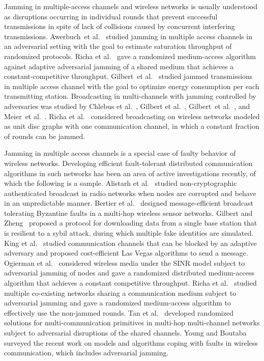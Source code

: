 \documentclass[11pt]{article}
\begin{document}
Jamming in multiple-access channels and wireless networks is usually understood as disruptions occurring in individual rounds that prevent successful transmissions in spite of lack of collisions caused by concurrent interfering transmissions.
Awerbuch~et al.~\cite{AwerbuchRSSZ14} studied jamming in multiple access channels in an adversarial setting with the goal to estimate saturation throughput of randomized protocols.
Richa et al.~\cite{RichaSSZ-TN13} gave a randomized medium-access algorithm against adaptive adversarial jamming of a shared medium that achieves a constant-competitive throughput. 
Gilbert~et al.~\cite{GilbertKPPSY14} studied jammed transmissions in multiple access channel with the goal to optimize energy consumption per each transmitting station.
Broadcasting in multi-channels with  jamming controlled by adversaries was studied by Chlebus et al.~\cite{ChlebusDK16}, Gilbert et al.~\cite{GilbertGKN-INFOCOM09}, Gilbert~et al.~\cite{GilbertGN09},  and Meier~et al.~\cite{MeierPSW09}.
Richa et al.~\cite{RichaSSZ-DC13} considered broadcasting on wireless networks modeled as unit disc graphs with one communication channel, in which a constant fraction of rounds can be jammed.

Jamming in multiple access channels is a special case of faulty behavior of wireless  networks.
Developing efficient fault-tolerant distributed communication algorithms in such networks has been an area of active investigations recently, of which the following is a sample.
 Alistarh et al.~\cite{AlistarhGGMN-SPAA10} studied non-cryptographic authenticated broadcast in radio networks when nodes are corrupted and behave in an unpredictable manner.
Bertier et al.~\cite{BertierKT-ICDCS10} designed message-efficient broadcast tolerating
Byzantine faults in a multi-hop wireless sensor networks.
Gilbert and Zheng~\cite{GilbertZ-TOPC15} proposed a protocol for downloading data from a single base station that is resilient to a sybil attack, during which multiple fake identities are simulated.
King et al.~\cite{KingSY-PODC11} studied communication channels that can be blocked by an adaptive adversary and proposed cost-efficient Las Vegas algorithms to send a message.
Ogierman et al.~\cite{OgiermanRSSZ14} 	considered wireless media under the SINR model subject to adversarial jamming of nodes and gave a randomized distributed medium-access  algorithm that achieves a constant competitive throughput.
Richa et al.~\cite{RichaSSZ-PODC12} studied multiple co-existing networks sharing a communication medium subject to adversarial jamming and gave a randomized medium-access algorithm to  effectively use the non-jammed rounds.
Tan et al.~\cite{TanWNS14} developed randomized solutions for multi-communication primitives in multi-hop multi-channel networks subject to adversarial disruptions of the shared channels. 
Young and Boutaba~\cite{YoungB11} surveyed the recent work on models and algorithms coping with faults in wireless communication, which includes adversarial jamming. 
\end{document}
